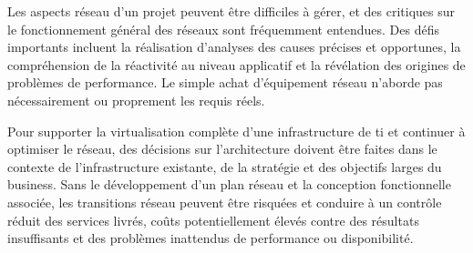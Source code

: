 Les aspects réseau d'un projet peuvent être difficiles à gérer, et des critiques sur le fonctionnement général des réseaux sont fréquemment entendues. Des défis importants incluent la réalisation d'analyses des causes précises et opportunes, la compréhension de la réactivité au niveau applicatif et la révélation des origines de problèmes de performance. Le simple achat d'équipement réseau n'aborde pas nécessairement ou proprement les requis réels.





Pour supporter la virtualisation complète d'une infrastructure de \gls{ti} et continuer à optimiser le réseau, des décisions sur l'architecture doivent être faites dans le contexte de l'infrastructure existante, de la stratégie et des objectifs larges du business. Sans le développement d'un plan réseau et la conception fonctionnelle associée, les transitions réseau peuvent être risquées et conduire à un contrôle réduit des services livrés, coûts potentiellement élevés contre des résultats insuffisants et des problèmes inattendus de performance ou disponibilité. 

